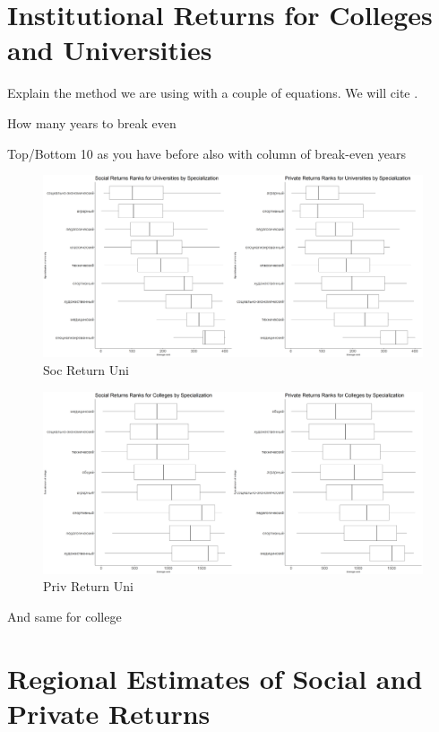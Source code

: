 \documentclass[alpha-refs]{wiley-article-05g}
\begin{document}
\section{Institutional Returns for Colleges and Universities}

Explain the method we are using with a couple of equations. We will cite \cite{Psacharopoulos_1995}.

How many years to break even

Top/Bottom 10 as you have before also with column of break-even years

\begin{figure}[htbp!]
	\centering
	\includegraphics[width=400pt]{socret_uni.png}
	\caption{Soc Return Uni}\label{fig:2.1}
\end{figure}


\begin{figure}[htbp!]
	\centering
	\includegraphics[width=400pt]{socret_col.png}
	\caption{Priv Return Uni}\label{fig:2.2}
\end{figure}

And same for college

\lipsum[2]

\lipsum[3]

\section{Regional Estimates of Social and Private Returns}
\end{document}
